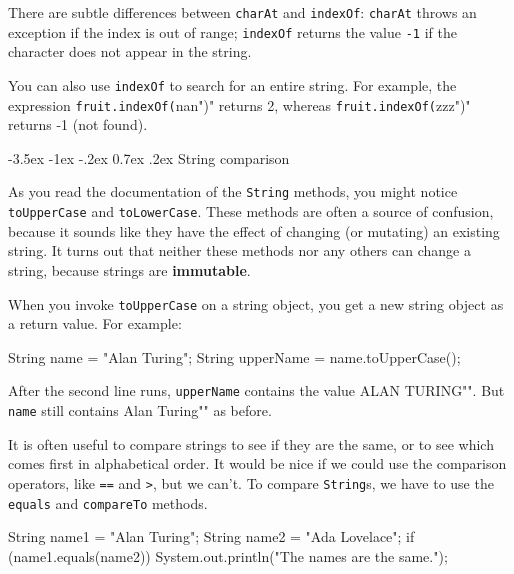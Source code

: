 \documentclass[12pt]{book}
\makeatletter
\theoremstyle{exercise}
\newcommand{\java}[1]{\verb"#1"}
\renewcommand{\section}{\@startsection {section}{1}{\z@}%
    {-3.5ex \@plus -1ex \@minus -.2ex}%
    {0.7ex \@plus.2ex}%
    {\normalfont\Large\bfseries}}
\newcommand{\java}[1]{\lstinline{#1}} %
\makeatother
\begin{document}
There are subtle differences between \java{charAt} and \java{indexOf}:
\java{charAt} throws an exception if the index is out of range;
\java{indexOf} returns the value \java{-1} if the character does not appear in the string.

You can also use \java{indexOf} to search for an entire string.
For example, the expression \java{fruit.indexOf("nan")} returns 2, whereas \java{fruit.indexOf("zzz")} returns -1 (not found).


\section{String comparison}
\label{immutable}
\label{incomparable}


As you read the documentation of the \java{String} methods, you might notice \java{toUpperCase} and \java{toLowerCase}.
These methods are often a source of confusion, because it sounds like they have the effect of changing (or mutating) an existing string.
It turns out that neither these methods nor any others can change a string, because strings are {\bf immutable}.

When you invoke \java{toUpperCase} on a string object, you get a new string object as a return value.
For example:

\begin{code}
    String name = "Alan Turing";
    String upperName = name.toUpperCase();
\end{code}


After the second line runs, \java{upperName} contains the value \java{"ALAN TURING"}.
But \java{name} still contains \java{"Alan Turing"} as before.


It is often useful to compare strings to see if they are the same, or to see which comes first in alphabetical order.
It would be nice if we could use the comparison operators, like \java{==} and \java{>}, but we can't.
To compare \java{String}s, we have to use the \java{equals} and \java{compareTo} methods.

\begin{code}
    String name1 = "Alan Turing";
    String name2 = "Ada Lovelace";
    if (name1.equals(name2)) {
        System.out.println("The names are the same.");
    }
\end{code}
\end{document}
